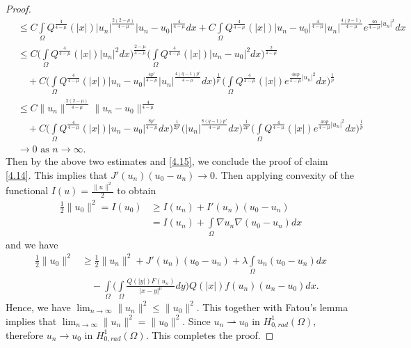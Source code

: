 \documentclass[11pt]{amsart}
\numberwithin{equation}{section}
\newcommand{\hr}{H^1_{0, rad}(\Omega)}
\newcommand{\1}{\frac{1}{2}}
\begin{document}
\begin{proof}
\begin{align}
			&\leq C \int\limits_\Omega Q^{\frac{4}{4-\mu}}(|x|) |u_n|^{\frac{2(2-\mu)}{4-\mu}}|u_n-u_0|^{\frac{4}{4-\mu}}dx + C \int\limits_\Omega Q^{\frac{4}{4-\mu}}(|x|) |u_n-u_0|^{\frac{4}{4-\mu}}|u_n|^{\frac{4(q-1)}{4-\mu}} e^{\frac{4\alpha}{4-\mu}|u_n|^2}dx\nonumber\\
			&\leq C \Bigg(\int\limits_\Omega Q^{\frac{4}{4-\mu}}(|x|) |u_n|^{2}dx\Bigg)^{\frac{2-\mu}{4-\mu}} \Bigg(\int\limits_\Omega Q^{\frac{4}{4-\mu}}(|x|) |u_n-u_0|^{2}dx\Bigg)^{\frac{2}{4-\mu}}\nonumber\\
			&\quad +C \Bigg( \int\limits_\Omega Q^{\frac{4}{4-\mu}}(|x|) |u_n-u_0|^{\frac{4p'}{4-\mu}} |u_n|^{\frac{4(q-1)p'}{4-\mu}}dx\Bigg)^{\frac{1}{p'}} \Bigg( \int\limits_\Omega Q^{\frac{4}{4-\mu}}(|x|) e^{\frac{4\alpha p}{4-\mu}|u_n|^2}dx\Bigg)^{\frac{1}{p}}\nonumber\\
			& \leq C\|u_n\|^{\frac{2(2-\mu)}{4-\mu}} \|u_n-u_0\|^{\frac{4}{4-\mu}} \nonumber\\
			& \quad+ C \Bigg( \int\limits_\Omega Q^{\frac{4}{4-\mu}}(|x|) |u_n-u_0|^{\frac{8p'}{4-\mu}}dx\Bigg)^{\frac{1}{2p'}}\Bigg( |u_n|^{\frac{8(q-1)p'}{4-\mu}}dx\Bigg)^{\frac{1}{2p'}}\Bigg( \int\limits_\Omega Q^{\frac{4}{4-\mu}}(|x|) e^{\frac{4\alpha p}{4-\mu}|u_n|^2}dx\Bigg)^{\frac{1}{p}}\nonumber\\
			& \to 0 \text{ as } n \to \infty.\nonumber
		\end{align}
		Then by the above two estimates and \eqref{4.15}, we conclude the proof of claim \eqref{4.14}. This implies that $J'(u_n)(u_0-u_n) \to 0$. Then applying convexity of the functional $I(u) = \frac{\|u\|^2}{2}$ to obtain
		\begin{align}
			\1\|u_0\|^2 = I(u_0) &\geq I(u_n) + I'(u_n)(u_0-u_n)\nonumber\\
			& = I(u_n) + \int\limits_\Omega \nabla u_n \nabla (u_0-u_n)dx\nonumber
		\end{align}
		and we have 
		\begin{align}
			\1\|u_0\|^2 
			&\geq \1 \|u_n\|^2 + J'(u_n)(u_0-u_n) +\lambda \int\limits_\Omega u_n(u_0-u_n)dx\nonumber\\
			&\quad - \int\limits_\Omega \Bigg( \int\limits_\Omega \frac{Q(|y|)F(u_n)}{|x-y|^\mu}dy\Bigg) Q(|x|)f(u_n)(u_n-u_0)dx.\nonumber
		\end{align}
		Hence, we have $\displaystyle\lim_{n\to \infty} \|u_n\|^2 \leq \|u_0\|^2$. This together with Fatou's lemma implies that $\displaystyle\lim_{n\to \infty} \|u_n\|^2 = \|u_0\|^2$. Since $u_n \rightharpoonup u_0$ in $\hr$, therefore $u_n \to u_0$ in $\hr$. This completes the proof.
	\end{proof}
\end{document}
